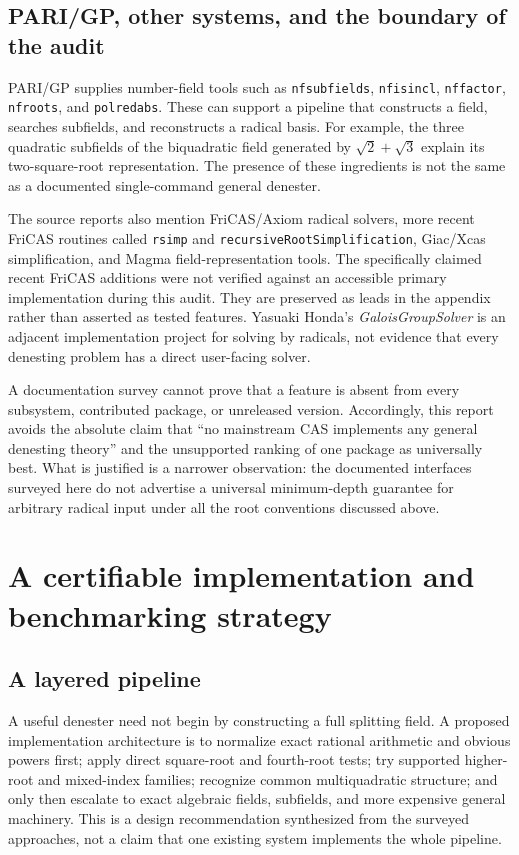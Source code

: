 \documentclass[11pt,a4paper]{article}
\theoremstyle{definition}
\theoremstyle{remark}
\numberwithin{equation}{section}
\begin{document}
\subsection{PARI/GP, other systems, and the boundary of the audit}

PARI/GP supplies number-field tools such as \texttt{nfsubfields}, \texttt{nfisincl}, \texttt{nffactor}, \texttt{nfroots}, and \texttt{polredabs}. These can support a pipeline that constructs a field, searches subfields, and reconstructs a radical basis. For example, the three quadratic subfields of the biquadratic field generated by $\sqrt2+\sqrt3$ explain its two-square-root representation. The presence of these ingredients is not the same as a documented single-command general denester.\cite{pari,kluners}

The source reports also mention FriCAS/Axiom radical solvers, more recent FriCAS routines called \texttt{rsimp} and \texttt{recursiveRootSimplification}, Giac/Xcas simplification, and Magma field-representation tools. The specifically claimed recent FriCAS additions were not verified against an accessible primary implementation during this audit. They are preserved as leads in the appendix rather than asserted as tested features. Yasuaki Honda's \emph{GaloisGroupSolver} is an adjacent implementation project for solving by radicals, not evidence that every denesting problem has a direct user-facing solver.\cite{honda}

A documentation survey cannot prove that a feature is absent from every subsystem, contributed package, or unreleased version. Accordingly, this report avoids the absolute claim that ``no mainstream CAS implements any general denesting theory'' and the unsupported ranking of one package as universally best. What is justified is a narrower observation: the documented interfaces surveyed here do not advertise a universal minimum-depth guarantee for arbitrary radical input under all the root conventions discussed above.

\section{A certifiable implementation and benchmarking strategy}
\label{sec:certificates}

\subsection{A layered pipeline}

A useful denester need not begin by constructing a full splitting field. A proposed implementation architecture is to normalize exact rational arithmetic and obvious powers first; apply direct square-root and fourth-root tests; try supported higher-root and mixed-index families; recognize common multiquadratic structure; and only then escalate to exact algebraic fields, subfields, and more expensive general machinery. This is a design recommendation synthesized from the surveyed approaches, not a claim that one existing system implements the whole pipeline.
\end{document}
